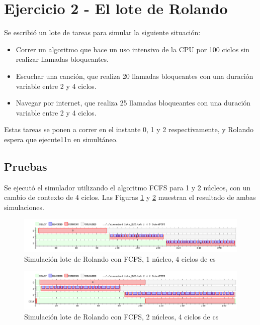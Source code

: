 \section{Ejercicio 2 - El lote de Rolando}

Se escribió un lote de tareas para simular la siguiente situación:

\begin{itemize}
	\item Correr un algoritmo que hace un uso intensivo de la CPU por 100 ciclos sin realizar llamadas bloqueantes.
	\item Escuchar una canción, que realiza 20 llamadas bloqueantes con una duración variable entre 2 y 4 ciclos.
	\item Navegar por internet, que realiza 25 llamadas bloqueantes con una duración variable entre 2 y 4 ciclos.
\end{itemize}

Estas tareas se ponen a correr en el instante 0, 1 y 2 respectivamente, y Rolando espera que ejecute11n en simultáneo.

\subsection{Pruebas}

Se ejecutó el simulador utilizando el algoritmo FCFS para 1 y 2 núcleos, con un cambio de contexto de 4 ciclos.  Las Figuras \ref{fig-rol1core} y \ref{fig-rol2core} muestran el resultado de ambas simulaciones.

\begin{figure}[!htb]
\begin{center}
  \includegraphics[scale=0.45]{imagenes/ej2-1core.png}
\end{center}
\caption{Simulación lote de Rolando con FCFS, 1 núcleo, 4 ciclos de cs}\label{fig-rol1core}
\end{figure}

\begin{figure}[!htb]
\begin{center}
  \includegraphics[scale=0.45]{imagenes/ej2-2core.png}
\end{center}
\caption{Simulación lote de Rolando con FCFS, 2 núcleos, 4 ciclos de cs}\label{fig-rol2core}
\end{figure}

